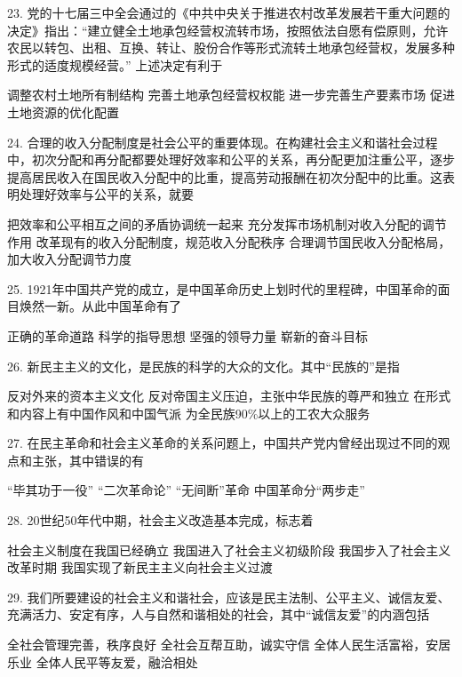 23. 党的十七届三中全会通过的《中共中央关于推进农村改革发展若干重大问题的决定》指出：“建立健全土地承包经营权流转市场，按照依法自愿有偿原则，允许农民以转包、出租、互换、转让、股份合作等形式流转土地承包经营权，发展多种形式的适度规模经营。” 上述决定有利于
\begin{choices}
	 调整农村土地所有制结构
	 完善土地承包经营权权能
	 进一步完善生产要素市场
	 促进土地资源的优化配置
\end{choices}
24. 合理的收入分配制度是社会公平的重要体现。在构建社会主义和谐社会过程中，初次分配和再分配都要处理好效率和公平的关系，再分配更加注重公平，逐步提高居民收入在国民收入分配中的比重，提高劳动报酬在初次分配中的比重。这表明处理好效率与公平的关系，就要
\begin{choices}
	 把效率和公平相互之间的矛盾协调统一起来
	 充分发挥市场机制对收入分配的调节作用
	 改革现有的收入分配制度，规范收入分配秩序
	 合理调节国民收入分配格局，加大收入分配调节力度
\end{choices}
25. 1921年中国共产党的成立，是中国革命历史上划时代的里程碑，中国革命的面目焕然一新。从此中国革命有了
\begin{choices}
	 正确的革命道路
	 科学的指导思想
	 坚强的领导力量
	 崭新的奋斗目标
\end{choices}
26. 新民主主义的文化，是民族的科学的大众的文化。其中“民族的”是指
\begin{choices}
	 反对外来的资本主义文化
	 反对帝国主义压迫，主张中华民族的尊严和独立
	 在形式和内容上有中国作风和中国气派
	 为全民族90\%以上的工农大众服务
\end{choices}
27. 在民主革命和社会主义革命的关系问题上，中国共产党内曾经出现过不同的观点和主张，其中错误的有
\begin{choices}
	 “毕其功于一役”
	 “二次革命论”
	 “无间断”革命
	 中国革命分“两步走”
\end{choices}
28. 20世纪50年代中期，社会主义改造基本完成，标志着
\begin{choices}
	 社会主义制度在我国已经确立
	 我国进入了社会主义初级阶段
	 我国步入了社会主义改革时期
	 我国实现了新民主主义向社会主义过渡
\end{choices}
29. 我们所要建设的社会主义和谐社会，应该是民主法制、公平主义、诚信友爱、充满活力、安定有序，人与自然和谐相处的社会，其中“诚信友爱”的内涵包括
\begin{choices}
	 全社会管理完善，秩序良好
	 全社会互帮互助，诚实守信
	 全体人民生活富裕，安居乐业
	 全体人民平等友爱，融洽相处
\end{choices}
